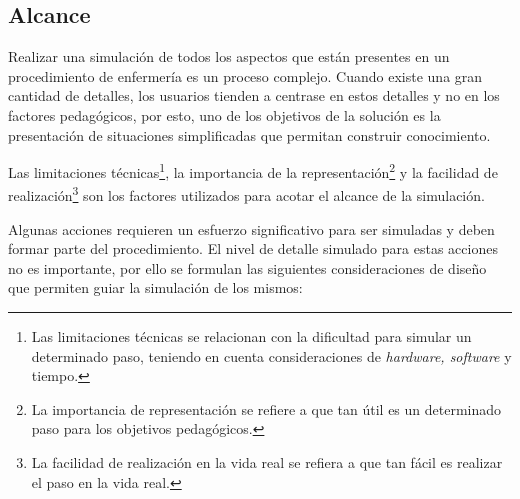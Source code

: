 \subsection{Alcance}

Realizar una simulación de todos los aspectos que están presentes en un
procedimiento de enfermería es un proceso complejo. Cuando existe una gran
cantidad de detalles, los usuarios tienden a centrase en estos detalles y no en
los factores pedagógicos\cite{videojuegos:gonzaleztardon}, por esto, uno de los
objetivos de la solución es la presentación de situaciones simplificadas que
permitan construir conocimiento.

Las limitaciones técnicas\footnote{Las limitaciones técnicas se relacionan con
    la dificultad para simular un determinado paso, teniendo en cuenta
    consideraciones de \textit{hardware, software} y tiempo.}, la importancia de
la representación\footnote{La importancia de representación se refiere a que tan útil es
    un determinado paso para los objetivos pedagógicos.} y la facilidad de
realización\footnote{La facilidad de realización en la vida real
    se refiera a que tan fácil es realizar el paso en la vida real.} son los
factores utilizados para acotar el alcance de la simulación.

Algunas acciones requieren un esfuerzo significativo para ser simuladas y deben
formar parte del procedimiento. El nivel de detalle simulado para estas acciones
no es importante, por ello se formulan las siguientes consideraciones de diseño 
que permiten guiar la simulación de los mismos:



